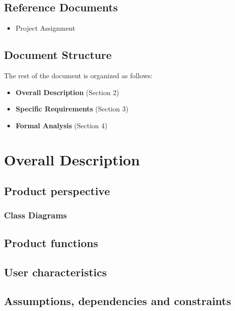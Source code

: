 \documentclass {article}
\begin{document}
	\subsection{Reference Documents}
		
		\begin{itemize}
   	
			 \item Project Assignment
			\end{itemize}

	\subsection{Document Structure}
			The rest of the document is organized as follows:
				\begin{itemize}
					\item {\bf Overall Description} (Section 2) 					
					\item {\bf Specific Requirements} (Section 3) 
					\item {\bf Formal Analysis} (Section 4)				
					\end{itemize}

\pagebreak	
	
\section{Overall Description}
	\subsection{Product perspective}
	
	\subsubsection{Class Diagrams}
		

	\subsection{Product functions}
		
	\subsection{User characteristics}
	
	\subsection{Assumptions, dependencies and constraints}
\end{document}
